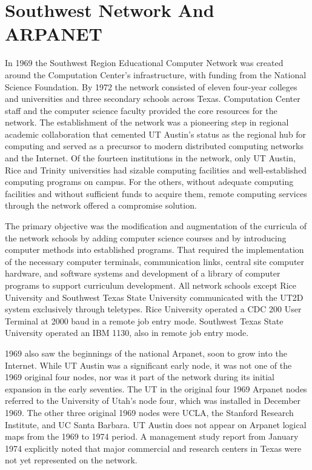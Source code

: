 \section{Southwest Network And ARPANET}

In 1969 the Southwest Region Educational Computer Network was created around the Computation Center’s infrastructure, with funding from the National Science Foundation. By 1972 the network consisted of eleven four-year colleges and universities and three secondary schools across Texas. Computation Center staff and the computer science faculty provided the core resources for the network. The establishment of the network was a pioneering step in regional academic collaboration that cemented UT Austin’s status as the regional hub for computing and served as a precursor to modern distributed computing networks and the Internet. Of the fourteen institutions in the network, only UT Austin, Rice and Trinity universities had sizable computing facilities and well-established computing programs on campus. For the others, without adequate computing facilities and without sufficient funds to acquire them, remote computing services through the network offered a compromise solution. 

The primary objective was the modification and augmentation of the curricula of the network schools by adding computer science courses and by introducing computer methods into established programs. That required the implementation of the necessary computer terminals, communication links, central site computer hardware, and software systems and development of a library of computer programs to support curriculum development. All network schools except Rice University and Southwest Texas State University communicated with the UT2D system exclusively through teletypes. Rice University operated a CDC 200 User Terminal at 2000 baud in a remote job entry mode. Southwest Texas State University operated an IBM 1130, also in remote job entry mode. 

1969 also saw the beginnings of the national Arpanet, soon to grow into the Internet. While UT Austin was a significant early node, it was not one of the 1969 original four nodes, nor was it part of the network during its initial expansion in the early seventies. The UT in the original four 1969 Arpanet nodes referred to the University of Utah’s node four, which was installed in December 1969. The other three original 1969 nodes were UCLA, the Stanford Research Institute, and UC Santa Barbara. UT Austin does not appear on Arpanet logical maps from the 1969 to 1974 period. A management study report from January 1974 explicitly noted that major commercial and research centers in Texas were not yet represented on the network. 

